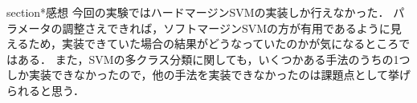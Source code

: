 section*{感想}
今回の実験ではハードマージンSVMの実装しか行えなかった．
パラメータの調整さえできれば，ソフトマージンSVMの方が有用であるように見えるため，実装できていた場合の結果がどうなっていたのかが気になるところではある．
また，SVMの多クラス分類に関しても，いくつかある手法のうちの1つしか実装できなかったので，他の手法を実装できなかったのは課題点として挙げられると思う．